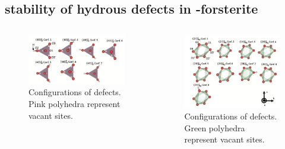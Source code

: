 \documentclass[13pt,aspectratio=169]{beamer}
\begin{document}
\subsection{stability of hydrous defects in -forsterite}
\begin{frame}[allowframebreaks]{\subsecname}
	\begin{columns}
		\begin{column}{0.4\textwidth}
			\begin{figure}
				\includegraphics[width=\columnwidth]{images/si}%
				\caption{Configurations of 
				defects. Pink polyhedra represent vacant  sites.}
			\end{figure}
		\end{column}

		\begin{column}{0.4\textwidth}
			\begin{figure}
				\includegraphics[width=\columnwidth]{images/mg}%
				\caption{Configurations of 
				defects. Green polyhedra represent vacant  sites.}
			\end{figure}
		\end{column}
	\end{columns}


\end{frame}
\end{document}
